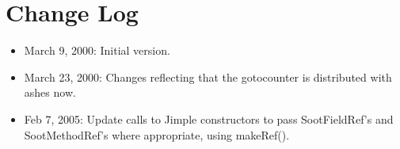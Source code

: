 \documentclass{article}
\begin{document}
\section*{Change Log}
\begin{itemize}
\item March 9, 2000: Initial version.

\item March 23, 2000: Changes reflecting that the gotocounter is
distributed with ashes now.

\item Feb 7, 2005: Update calls to Jimple constructors to pass
  SootFieldRef's and SootMethodRef's where appropriate, using makeRef().
\end{itemize}
\end{document}
